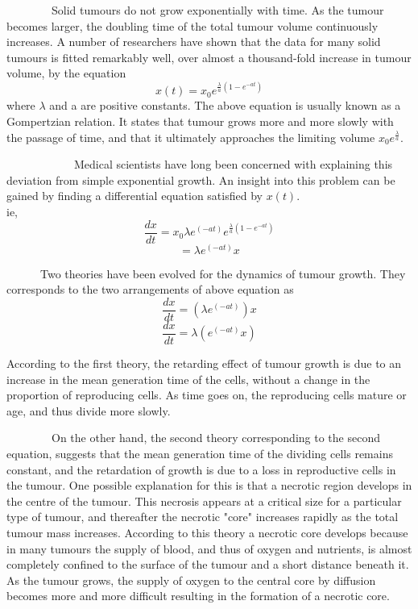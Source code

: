 \par ~~~~~~~~Solid tumours do not grow exponentially with time. As the tumour becomes larger, the doubling time of the total tumour volume continuously increases. A number of researchers have shown that the data for many solid tumours is fitted remarkably well, over almost a thousand-fold increase in tumour volume, by the equation                  
$$ x(t)=x_{0} e^{\frac{\lambda}{a} (1-e^{-at})} $$                                  
where $ \lambda $ and a are positive constants. The above equation is usually known as a Gompertzian relation. It states that tumour grows more and more slowly with the passage of time, and that it ultimately approaches the limiting volume $ x_{0}e^{\frac{\lambda}{a}} $. 

\par ~~~~~~~~~~~~Medical scientists have long been concerned with explaining this deviation from simple exponential growth. An insight into this  problem can be gained by finding a differential equation satisfied by $ x(t) $.    
%
%
\\
ie, $$\frac{dx}{dt}=x_{0} \lambda e^{(-at)} e^{\frac{\lambda}{a} (1-e^{-at})} $$
$$ =\lambda e^{(-at)}x $$
               
 \par ~~~~~~Two theories have been evolved for the  dynamics of tumour growth. They corresponds to the two  arrangements of above equation as
 $$ \frac{dx}{dt}=(\lambda e^{(-at)})x  $$
 $$ \frac{dx}{dt}=\lambda (e^{(-at)}x) $$







According to the first theory, the retarding effect of tumour growth is due to an increase in the mean generation time of the cells,   without a change in the proportion of reproducing cells. As time goes on, the   reproducing cells mature or age, and thus divide more slowly.

\par   ~~~~~~~~On the other hand, the second theory corresponding to the second equation, suggests that the mean generation time of the dividing cells remains constant, and the retardation of growth is due to a loss in reproductive cells in the tumour. One possible explanation for this is that a necrotic region develops in the centre of the tumour. This necrosis appears at a critical size for a particular type of tumour, and thereafter the necrotic "core" increases rapidly as the total tumour mass increases. According to this theory a necrotic core develops because in many tumours the supply of blood, and thus of oxygen and nutrients, is almost completely confined to the surface of the tumour and a short distance beneath it. As the tumour grows, the supply of oxygen to the central core by diffusion becomes more and more difficult resulting in the formation of a necrotic core.

